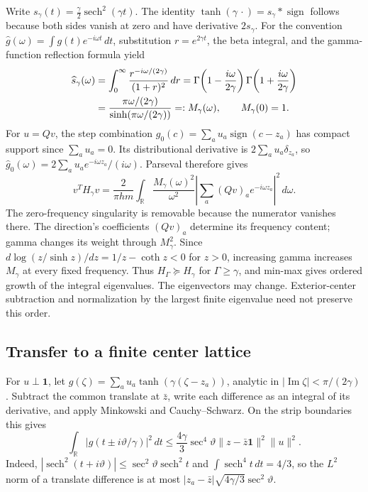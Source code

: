 Write $s_\gamma(t)=\frac\gamma2\operatorname{sech}^2(\gamma t)$. The identity
$\tanh(\gamma\,\cdot)=s_\gamma*\operatorname{sign}$ follows because both sides
vanish at zero and have derivative $2s_\gamma$. For the convention
$\widehat g(\omega)=\int g(t)e^{-i\omega t}\,dt$, substitution
$r=e^{2\gamma t}$, the beta integral, and the gamma-function reflection formula
yield
\begin{align}
 \widehat s_\gamma(\omega)
 &=\int_0^\infty\frac{r^{-i\omega/(2\gamma)}}{(1+r)^2}\,dr
 =\Gamma\!\left(1-\frac{i\omega}{2\gamma}\right)
  \Gamma\!\left(1+\frac{i\omega}{2\gamma}\right)\notag\\
 &=\frac{\pi\omega/(2\gamma)}{\sinh(\pi\omega/(2\gamma))}
 =:M_\gamma(\omega),\qquad M_\gamma(0)=1.
\end{align}
For $u=Qv$, the step combination
$g_0(c)=\sum_a u_a\operatorname{sign}(c-z_a)$ has compact support since
$\sum_a u_a=0$. Its distributional derivative is
$2\sum_a u_a\delta_{z_a}$, so
$\widehat g_0(\omega)=2\sum_a u_a e^{-i\omega z_a}/(i\omega)$.
Parseval therefore gives
\begin{equation}
 v^TH_\gamma v=\frac2{\pi hm}\int_{\mathbb R}
 \frac{M_\gamma(\omega)^2}{\omega^2}
 \left|\sum_a(Qv)_a e^{-i\omega z_a}\right|^2\,d\omega.
 \label{eq:app-slope-fourier}
\end{equation}
The zero-frequency singularity is removable because the numerator vanishes
there. The direction's coefficients $(Qv)_a$ determine its frequency content;
gamma changes its weight through $M_\gamma^2$. Since
$d\log(z/\sinh z)/dz=1/z-\coth z<0$ for $z>0$, increasing gamma increases
$M_\gamma$ at every fixed frequency. Thus $H_\Gamma\succeq H_\gamma$ for
$\Gamma\ge\gamma$, and min-max gives ordered growth of the integral
eigenvalues. The eigenvectors may change. Exterior-center subtraction and
normalization by the largest finite eigenvalue need not preserve this order.

\subsection{Transfer to a finite center lattice}
For $u\perp\mathbf1$, let
$g(\zeta)=\sum_a u_a\tanh(\gamma(\zeta-z_a))$, analytic in
$|\operatorname{Im}\zeta|<\pi/(2\gamma)$. Subtract the common translate at
$\bar z$, write each difference as an integral of its derivative, and apply
Minkowski and Cauchy--Schwarz. On the strip boundaries this gives
\begin{equation}
 \int_{\mathbb R}|g(t\pm i\vartheta/\gamma)|^2\,dt
 \le\frac{4\gamma}{3}\sec^4\vartheta
 \|z-\bar z\mathbf1\|^2\|u\|^2.
 \label{eq:app-slope-strip}
\end{equation}
Indeed,
$|\operatorname{sech}^2(t+i\vartheta)|\le
\sec^2\vartheta\operatorname{sech}^2t$ and
$\int\operatorname{sech}^4t\,dt=4/3$, so the $L^2$ norm of a translate
difference is at most
$|z_a-\bar z|\sqrt{4\gamma/3}\sec^2\vartheta$.

